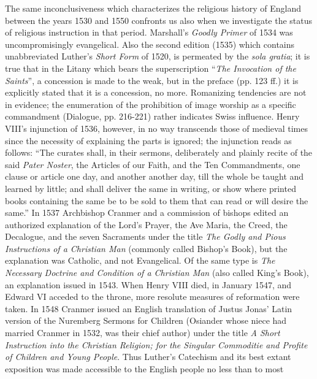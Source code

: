 The same inconclusiveness which characterizes the religious history of England between the years 1530 and 1550 confronts us also when we investigate the status of religious instruction in that period. Marshall’s \emph{Goodly Primer} of 1534 was uncompromisingly evangelical. Also the second edition (1535) which contains unabbreviated Luther’s \emph{Short Form} of 1520, is permeated by the \emph{sola gratia}; it is true that in
the Litany which bears the superscription “\emph{\emph{The Invocation of the Saints}}”, a concession is made to the weak, but in the preface (pp. 123 ff.) it is explicitly stated that it is a concession, no more. Romanizing tendencies are not in evidence; the enumeration of the prohibition of image worship as a specific commandment (Dialogue, pp. 216-221) rather indicates Swiss influence. Henry VIII’s injunction of 1536, however, in no way transcends those of medieval times since the necessity of explaining the parts is ignored; the injunction reads as follows: “The curates shall, in their sermons, deliberately and plainly recite of the said \emph{Pater Noster}, the Articles of our Faith, and the Ten Commandments, one clause or article one day, and another another day, till the whole be taught and learned by little; and shall deliver the same in writing, or show where printed books containing the same be to be sold to them that can read or will desire the same.” In 1537 Archbishop Cranmer and a commission of bishops edited an authorized explanation of the Lord’s Prayer, the Ave Maria, the Creed, the Decalogue, and the seven Sacraments under the title \emph{The Godly and Pious Instructions of a Christian Man} (commonly called Bishop’s Book), but the explanation was Catholic, and not Evangelical. Of the same type is \emph{The Necessary Doctrine and Condition of a Christian Man} (also called King’s Book), an explanation issued in 1543. When Henry VIII died, in January 1547, and Edward VI acceded to the throne, more resolute measures of reformation were taken. In 1548 Cranmer issued an English translation of Justus Jonas’ Latin version of the Nuremberg Sermons for Children (Osiander whose niece had married Cranmer in 1532, was their chief author) under the title \emph{A Short Instruction into the Christian Religion; for the Singular Commoditie and Profite of Children and Young People}. Thus Luther’s Catechism and its best extant exposition was made accessible to the English people no less than to most
